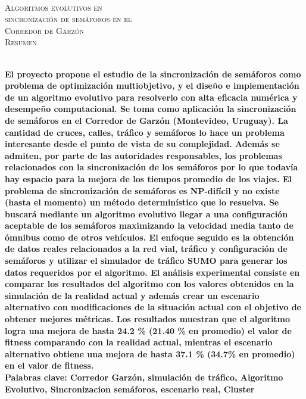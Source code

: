 {
\thispagestyle{empty}
~\\[0.2cm]
\begin{center}
    \textsc{\huge Algoritmos evolutivos en  } \\[0.2cm] 
    \textsc{\huge sincronización de semáforos en el  } \\[0.2cm]         
    \textsc{\huge Corredor de Garzón} \\[1cm]
    \textsc{\Large Resumen}
\end{center}
~\\[0.2cm]
\textbf{\large 
El proyecto propone el estudio de la sincronización de semáforos como problema de optimización multiobjetivo, y el diseño e implementación de un algoritmo evolutivo para resolverlo con alta eficacia numérica y desempeño computacional. \newline \newline
Se toma como aplicación la sincronización de semáforos en el Corredor de Garzón  (Montevideo, Uruguay). La cantidad de cruces, calles, tráfico y semáforos lo hace un problema interesante desde el punto de vista de su complejidad. Además se admiten, por parte de las autoridades responsables, los problemas relacionados con la sincronización de los semáforos por lo que todavía hay espacio para la mejora de los tiempos promedio de los viajes.  \newline \newline
El problema de sincronización de semáforos es NP-difícil y no existe (hasta el momento) un método determinístico que lo resuelva. Se buscará mediante un algoritmo evolutivo llegar a una configuración aceptable de los semáforos maximizando la velocidad media tanto de ómnibus como de otros vehículos.
El enfoque seguido es la obtención de datos reales relacionados a la red vial, tráfico y configuración de semáforos y utilizar el simulador de tráfico SUMO para generar los datos requeridos por el algoritmo.
\newline \newline
El análisis experimental consiste en comparar los resultados del algoritmo con los valores obtenidos en la simulación de la realidad actual y además crear un escenario alternativo con modificaciones de la situación actual con el objetivo de obtener mejores métricas. Los resultados muestran que el algoritmo logra una mejora de hasta  24.2 \% (21.40 \% en promedio) el valor de fitness comparando con la realidad actual, mientras el escenario alternativo obtiene una mejora de hasta 37.1 \% (34.7\% en promedio) en el valor de fitness.
 } 	
	~\\[1.0cm]
    \textbf{\large Palabras clave: Corredor Garzón, simulación de tráfico,  Algoritmo Evolutivo, Sincronizacion semáforos, escenario real, Cluster}

}
\cleardoublepage
